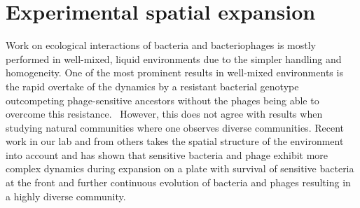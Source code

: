 \section{Experimental spatial expansion}
Work on ecological interactions of bacteria and bacteriophages is mostly performed in well-mixed, liquid environments due to the simpler handling and homogeneity. One of the most prominent results in well-mixed environments is the rapid overtake of the dynamics by a resistant bacterial genotype outcompeting phage-sensitive ancestors without the phages being able to overcome this resistance.~\cite{Lenski1985-wb}  
However, this does not agree with results when studying natural communities where one observes diverse communities. Recent work in our lab and from others takes the spatial structure of the environment into account and has shown that sensitive bacteria and phage exhibit more complex dynamics during expansion on a plate with survival of sensitive bacteria at the front and further continuous evolution of bacteria and phages resulting in a highly diverse community.~\cite{Shaer-Tamar2022-cq, Marchi2025-yu, Ping2020-vd}

